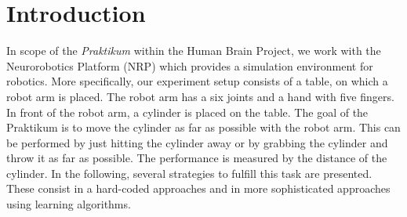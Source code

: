\section{Introduction}
In scope of the \textit{Praktikum} within the Human Brain Project, we work with the Neurorobotics Platform (NRP) which provides a simulation environment for robotics.
More specifically, our experiment setup consists of a table, on which a robot arm is placed.
The robot arm has a six joints and a hand with five fingers.
In front of the robot arm, a cylinder is placed on the table.
The goal of the Praktikum is to move the cylinder as far as possible with the robot arm.
This can be performed by just hitting the cylinder away or by grabbing the cylinder and throw it as far as possible.
The performance is measured by the distance of the cylinder.
In the following, several strategies to fulfill this task are presented.
These consist in a hard-coded approaches and in more sophisticated approaches using learning algorithms.